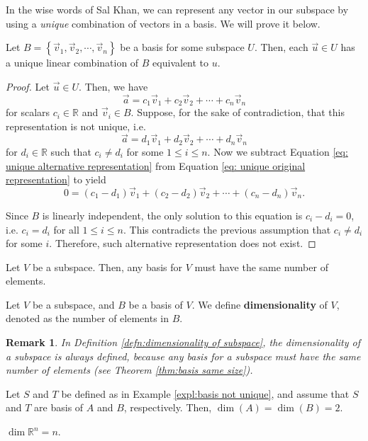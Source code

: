 \documentclass[]{book}
\DeclareMathOperator{\spacedim}{dim}
\newcommand{\vecn}[1]{\ensuremath{\vec{v}_{#1}}}
\newtheorem*{remark}{Remark}
\begin{document}
In the wise words of Sal Khan, we can represent any vector in our subspace by using a \textit{unique} combination of vectors in a basis. We will prove it below.
\begin{theorem}
    \label{thm: uniqueness of basis representation}
    Let $B=\left\{\vecn{1}, \vecn{2}, \cdots, \vecn{n}\right\}$ be a basis for some subspace $U$. Then, each $\vec{u} \in U$ has a unique linear combination of $B$ equivalent to $u$.
\begin{proof}
    Let $\vec{u} \in U$. Then, we have
    \begin{equation}
        \label{eq: unique original representation}
        \vec{a} = c_1\vecn{1} + c_2\vecn{2} + \cdots + c_n\vecn{n}
    \end{equation}
    for scalars $c_i \in \mathbb{R}$ and $\vecn{i} \in B$. Suppose, for the sake of contradiction, that this representation is not unique, i.e. 
    \begin{equation}
        \label{eq: unique alternative representation}
        \vec{a} = d_1\vecn{1} + d_2\vecn{2} + \cdots + d_n\vecn{n}
    \end{equation}
    for $d_i \in \mathbb{R}$ such that $c_i \neq d_i$ for some $1 \leq i \leq n$. Now we subtract Equation \ref{eq: unique alternative representation} from Equation \ref{eq: unique original representation} to yield
    \[0 = (c_1-d_1)\vecn{1} + (c_2-d_2)\vecn{2} + \cdots + (c_n - d_n)\vecn{n}.\]
    
    Since $B$ is linearly independent, the only solution to this equation is $c_i-d_i=0$, i.e. $c_i=d_i$ for all $1 \leq i \leq n$. This contradicts the previous assumption that $c_i \neq d_i$ for some $i$. Therefore, such alternative representation does not exist.
\end{proof}
\end{theorem}
\begin{theorem}
    \label{thm:basis same size}
    Let $V$ be a subspace. Then, any basis for $V$ must have the same number of elements.
\end{theorem}
\begin{definition}
    \label{defn:dimensionality of subspace}
    Let $V$ be a subspace, and $B$ be a basis of $V$. We define \textbf{dimensionality} of $V$, denoted as the number of elements in $B$.
\end{definition}
\begin{remark}
    In Definition \ref{defn:dimensionality of subspace}, the dimensionality of a subspace is always defined, because any basis for a subspace must have the same number of elements (see Theorem \ref{thm:basis same size}).
\end{remark}
\begin{example}
    Let $S$ and $T$ be defined as in Example \ref{expl:basis not unique}, and assume that $S$ and $T$ are basis of $A$ and $B$, respectively. Then, $\spacedim(A)=\spacedim(B)=2$. \hfill \qedsymbol
\end{example}
\begin{example}
    $\spacedim{\mathbb{R}^n}=n$. \hfill \qedsymbol
\end{example}
\end{document}
